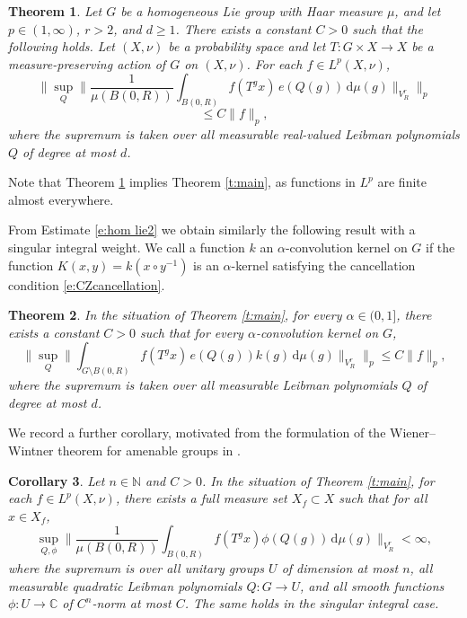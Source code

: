 \documentclass[12pt,reqno,a4paper,dvipsnames]{amsart}
\theoremstyle{plain}
\newtheorem{theorem}{Theorem}
\newtheorem{cor}[theorem]{Corollary}
\theoremstyle{definition}
\numberwithin{theorem}{section}
\numberwithin{equation}{section}
\begin{document}
\begin{theorem}\label{t:avg}
    Let $G$ be a homogeneous Lie group with Haar measure $\mu$, and let $p \in (1,\infty)$, $r > 2$, and $d \ge 1$. There exists a constant $C > 0$ such that the following holds. Let $(X,\nu)$ be a probability space and let $T \colon G \times X \to X$ be a measure-preserving action of $G$ on $(X,\nu)$. For each $f \in L^p(X, \nu)$,
    \begin{equation*}
        \Big\| \sup_{Q} \Big\|\frac{1}{\mu(B(0,R))} \int_{B(0,R)} 
        f(T^g x)\, e(Q(g))\, \mathrm{d}\mu(g)\Big\|_{V^r_R} \Big\|_{p} 
    \end{equation*}
    \begin{equation}\label{eq ww avg hom}
        \le C \|f\|_{p},
    \end{equation}
    where the supremum is taken over all measurable real-valued Leibman polynomials $Q$ of degree at most $d$. 
\end{theorem}


Note that Theorem \ref{t:avg} implies Theorem \ref{t:main}, as functions in $L^p$ are finite almost everywhere.

From Estimate \eqref{e:hom lie2} we obtain similarly the following result with a singular integral weight. We call a function $k$ an $\alpha$-convolution kernel on $G$ if the function $K(x,y) = k(x\circ y^{-1})$ is an $\alpha$-kernel satisfying the cancellation condition \eqref{e:CZcancellation}. 

\begin{theorem}
    \label{t:sing}
     In the situation of Theorem \ref{t:main}, for every $\alpha \in (0,1]$, there exists a constant $C > 0$ such that for every $\alpha$-convolution kernel on $G$,
    \begin{equation*}
        \Big\| \sup_{Q} \Big\|\int_{G\setminus B(0,R)} 
        f(T^g x)\, e(Q(g)) k(g) \, \mathrm{d}\mu(g)\Big\|_{V^r_R} \Big\|_{p} 
        \le C \|f\|_{p},
    \end{equation*}
    where the supremum is taken over all measurable Leibman polynomials $Q$ of degree at most $d$.
\end{theorem}

We record a further corollary, motivated from the formulation of the Wiener--Wintner theorem for amenable groups in \cite{ornstein-weiss,zk-return}. 

\begin{cor}\label{c:unitary}
    Let $n \in \mathbb{N}$ and $C > 0$.
    In the situation of Theorem \ref{t:main}, for each $f \in L^p(X, \nu)$, there exists a full measure set $X_f \subset X$ such that for all $x \in X_f$,
    \[
        \sup_{Q, \phi} \Big\| \frac{1}{\mu(B(0,R))}\int_{B(0,R)} f(T^g x) \phi(Q(g)) \, \mathrm{d}\mu(g) \Big\|_{V^r_R} < \infty,
    \]
     where the supremum is over all unitary groups $U$ of dimension at most $n$, all measurable quadratic Leibman polynomials $Q: G \to U$, and all smooth functions $\phi: U \to \mathbb{C}$ of $C^{n}$-norm at most $C$.
    The same holds in the singular integral case. 
\end{cor}
\end{document}
